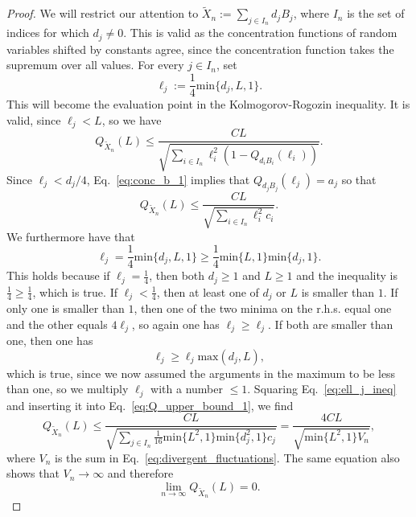 \documentclass[aps,pra,reprint,superscriptaddress]{revtex4-2}
\theoremstyle{definition}
\theoremstyle{remark}
\begin{document}
    \begin{proof}
        We will restrict our attention to $\tilde{X}_n := \sum_{j \in I_n} d_j
        B_j$, where $I_n$ is the set of indices for which $d_j \neq 0$. This is
        valid as the concentration functions of random variables shifted by constants
        agree, since the concentration function takes the supremum over all values.
        For every $j \in I_n$, set
        \begin{equation}
            \ell_j := \frac{1}{4} \mathrm{min}\{d_j,L,1\}.
        \end{equation}
        This will become the evaluation point in the Kolmogorov-Rogozin
        inequality. It is valid, since $\ell_j < L$, so we have 
        \begin{equation}
            Q_{\tilde{X}_n}(L) \leq \frac{C L}{\sqrt{\sum_{i\in I_n}
            \ell^2_i (1-Q_{d_i B_i}(\ell_i))}}.
        \end{equation}
        Since $\ell_j < d_j/4$, Eq.~\eqref{eq:conc_b_1} implies that 
        $Q_{d_j B_j}(\ell_j) = a_j$ so that 
        \begin{equation}\label{eq:Q_upper_bound_1}
            Q_{\tilde{X}_n}(L) \leq \frac{C L}{\sqrt{\sum_{i\in I_n}
            \ell^2_i c_i}}.
        \end{equation}
        We furthermore have that 
        \begin{equation}\label{eq:ell_j_ineq}
            \ell_j = \frac{1}{4} \mathrm{min}\{d_j,L,1\} \geq \frac{1}{4}
            \mathrm{min}\{L,1\} \mathrm{min}\{d_j,1\}.
        \end{equation}
        This holds because if $\ell_j = \frac{1}{4}$, then both $d_j \geq 1$ and $L \geq 1$
        and the inequality is $\frac{1}{4} \geq \frac{1}{4}$, which is true.
        If $\ell_j < \frac{1}{4}$, then at least one of $d_j$ or $L$ is smaller than $1$. If only one is
        smaller than $1$, then one of the two minima on the r.h.s. equal one
        and the other equals $4 \ell_j$, so again one has $\ell_j \geq \ell_j$.
        If both are smaller than one, then one has
        \begin{equation}
            \ell_j \geq \ell_j \mathrm{max}(d_j,L),
        \end{equation}
        which is true, since we now assumed the arguments in the maximum to be
        less than one, so we multiply $\ell_j$ with a number $\leq 1$.
        Squaring Eq.~\eqref{eq:ell_j_ineq} and inserting it into Eq.~\eqref{eq:Q_upper_bound_1}, we find 
        \begin{equation}
            Q_{\tilde{X}_n}(L) \leq \frac{C L}{\sqrt{\sum_{j\in I_n} \frac{1}{16}
            \mathrm{min}\{L^2,1\} \mathrm{min}\{d_j^2,1\}c_j}} = \frac{4 C L
        }{\sqrt{\mathrm{min}\{L^2,1\} V_n}},
        \end{equation}
        where $V_n$ is the sum in Eq.~\eqref{eq:divergent_fluctuations}. The
        same equation also shows that $V_n \rightarrow \infty$ and therefore
        \begin{equation}
           \lim_{n \rightarrow \infty} Q_{\tilde{X}_n}(L) = 0.
        \end{equation}
    \end{proof}
    
\end{document}
